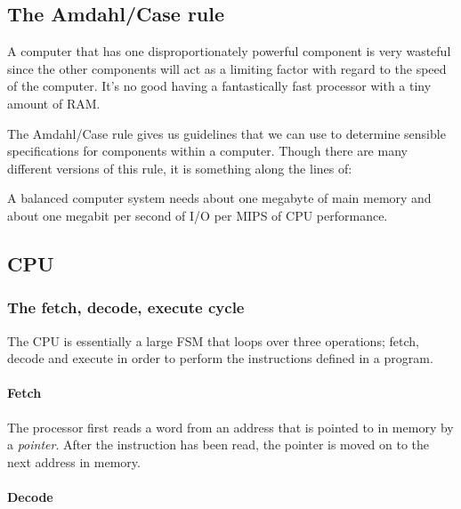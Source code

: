 \subsection{The Amdahl/Case rule}

A computer that has one disproportionately powerful component is very wasteful
since the other components will act as a limiting factor with regard to the
speed of the computer. It's no good having a fantastically fast processor with a
tiny amount of RAM.

The Amdahl/Case rule gives us guidelines that we can use to determine sensible
specifications for components within a computer. Though there are many different
versions of this rule, it is something along the lines of:


\begin{fancyquote}
		A balanced computer system needs about one megabyte of main memory and
		about one megabit per second of I/O per MIPS of CPU performance.
\end{fancyquote}

\subsection{CPU}

\subsubsection{The fetch, decode, execute cycle}
\label{subsubsec:fetch_decode_execute}

The CPU is essentially a large FSM that
loops over three operations; fetch, decode and execute in order to perform the
instructions defined in a program.

\paragraph{Fetch}\mbox{}

The processor first reads a word from an address
that is pointed to in memory by a {\it pointer}. After the instruction has been
read, the pointer is moved on to the next address in memory.

\paragraph{Decode}\mbox{}


